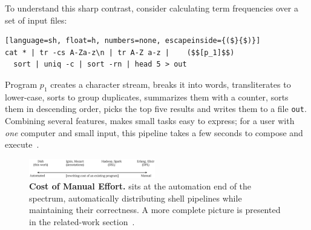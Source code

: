 \documentclass[sigplan,10pt,review,anonymous]{acmart}
\newcommand{\ttt}[1]{\texttt{\small #1}}
\begin{document}
To understand this sharp contrast, consider calculating term frequencies over a set of input files:


\begin{lstlisting}[language=sh, float=h, numbers=none, escapeinside={($}{$)}]
cat * | tr -cs A-Za-z\n | tr A-Z a-z |    ($$[p_1]$$)
  sort | uniq -c | sort -rn | head 5 > out
\end{lstlisting}

\noindent
Program $p_1$ creates a character stream, breaks it into words, transliterates to lower-case, sorts to group duplicates, summarizes them with a counter, sorts them in descending order, picks the top five results and writes them to a file \ttt{out}.
Combining several features, \unix makes small tasks easy to express;
  for a user with \emph{one} computer and small input, this pipeline takes a few seconds to compose and execute~\cite{bentley1986literate}.


\begin{figure}[t]
\centering
\includegraphics[width=0.49\textwidth]{./figs/dish_spectrum.pdf}
\caption{
  \textbf{Cost of Manual Effort.}
	\sys sits at the automation end of the spectrum, automatically distributing shell pipelines while maintaining their correctness. A more complete picture is presented in the related-work section~.
}
\label{fig:spectrum}
\end{figure}
\end{document}
